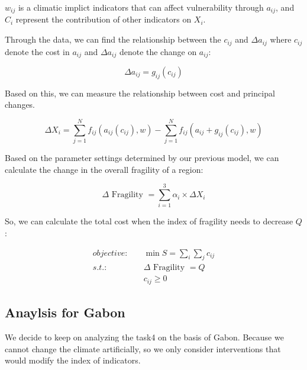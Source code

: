\documentclass{mcmthesis}
\begin{document}
			$w_{ij}$ is a climatic implict indicators that can affect vulnerability through $a_{ij}$, and $ C _ { i }$ represent the contribution of other indicators on $X_i$.
			
			Through the data, we can find the relationship between the $c_{ij}$ and $\Delta a_{ij}$ where $c_{ij}$ denote the cost in $a_{ij}$ and $\Delta a_{ij}$ denote the change on $a_{ij}$:
			
			\begin{equation}
				\Delta a_{ij} = g _ { ij } \left( c _ { ij } \right)
			\end{equation}
			
			Based on this, we can measure the relationship between cost and principal changes.
			
			\begin{equation}
				\Delta X _ { i } = \sum_{j = 1}^{N} f _ { ij } \left( a_{ij} \left( c _ { ij } \right) , w \right)  - \sum_{j = 1}^{N} f _ { ij } \left( a_{ij} + g _ { ij } \left( c _ { ij } \right) , w \right)
			\end{equation}
			
			Based on the parameter settings determined by our previous model, we can calculate the change in the overall fragility of a region:
			
			\begin{equation}
				\Delta \text { Fragility } = \sum_{i=1}^3 \alpha_{i} \times \Delta X _ { i }
			\end{equation}
			
			So, we can calculate the total cost when the index of fragility needs to decrease $Q$ :
			
			\begin{equation}
			\begin{split}
			objective:& \quad \min S = \sum_{i} \sum_{ j } c _ { ij } \\
			s.t.:& \quad \Delta \text { Fragility } = Q \\
			& \quad c _ { ij } \geq 0
			\end{split}
			\end{equation}
		
		
		\subsection{Anaylsis for Gabon}
		
			We decide to keep on analyzing the task4 on the basis of Gabon. Because we cannot change the climate artificially, so we only consider interventions that would modify the index of indicators.
			
\end{document}
